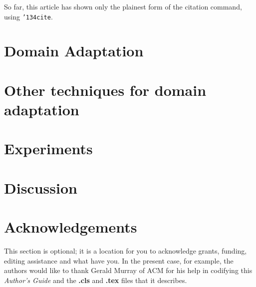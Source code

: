 \documentclass{sigkddExp}
\begin{document}
So far, this article has shown only the plainest form
of the citation command, using \texttt{{\char'134}cite}.
%
\section{Domain Adaptation}

\section{Other techniques for domain adaptation}

\section{Experiments}

\section{Discussion}

\section{Acknowledgements}
This section is optional; it is a location for you
to acknowledge grants, funding, editing assistance and
what have you.  In the present case, for example, the
authors would like to thank Gerald Murray of ACM for
his help in codifying this \textit{Author's Guide}
and the \textbf{.cls} and \textbf{.tex} files that it describes.

%

%
%

\end{document}
